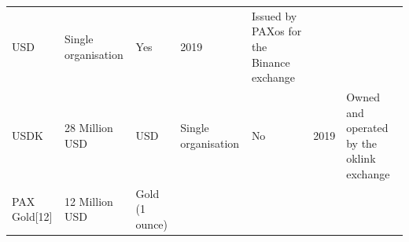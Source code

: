 \documentclass[english,]{IEEEtran}
\begin{document}
\begin{longtable}[]{@{}lllllll@{}}
\begin{minipage}[t]{0.08\columnwidth}
USD\strut
\end{minipage} & \begin{minipage}[t]{0.10\columnwidth}\raggedright\strut
Single organisation\strut
\end{minipage} & \begin{minipage}[t]{0.08\columnwidth}\raggedright\strut
Yes\strut
\end{minipage} & \begin{minipage}[t]{0.04\columnwidth}\raggedright\strut
2019\strut
\end{minipage} & \begin{minipage}[t]{0.30\columnwidth}\raggedright\strut
Issued by PAXos for the Binance exchange\strut
\end{minipage}\tabularnewline
\begin{minipage}[t]{0.14\columnwidth}\raggedright\strut
USDK\strut
\end{minipage} & \begin{minipage}[t]{0.08\columnwidth}\raggedright\strut
28 Million USD\strut
\end{minipage} & \begin{minipage}[t]{0.08\columnwidth}\raggedright\strut
USD\strut
\end{minipage} & \begin{minipage}[t]{0.10\columnwidth}\raggedright\strut
Single organisation\strut
\end{minipage} & \begin{minipage}[t]{0.08\columnwidth}\raggedright\strut
No\strut
\end{minipage} & \begin{minipage}[t]{0.04\columnwidth}\raggedright\strut
2019\strut
\end{minipage} & \begin{minipage}[t]{0.30\columnwidth}\raggedright\strut
Owned and operated by the oklink exchange\strut
\end{minipage}\tabularnewline
\begin{minipage}[t]{0.14\columnwidth}\raggedright\strut
PAX Gold{[}12{]}\strut
\end{minipage} & \begin{minipage}[t]{0.08\columnwidth}\raggedright\strut
12 Million USD\strut
\end{minipage} & \begin{minipage}[t]{0.08\columnwidth}\raggedright\strut
Gold (1 ounce)\strut
\end{minipage} & \begin{minipage}[t]{0.10\columnwidth}\raggedright\strut

\end{minipage}
\end{longtable}
\end{document}
